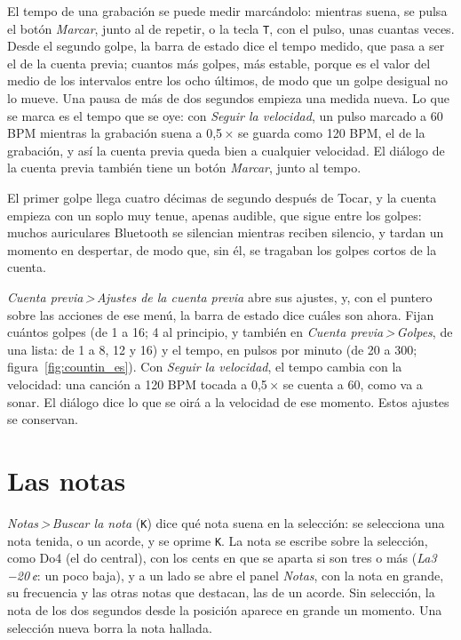 \documentclass[12pt,
              article,
              oneside
              ]{memoir}
\newcommand*{\menu}[1]{\textit{#1}}
\newcommand*{\then}{\,>\,}
\newcommand*{\key}[1]{\texttt{#1}}
\begin{document}
%
El tempo de una grabación se puede medir marcándolo: mientras suena, se
pulsa el botón \menu{Marcar}, junto al de repetir, o la tecla \key{T},
con el pulso, unas cuantas veces. Desde el segundo golpe, la barra de
estado dice el tempo medido, que pasa a ser el de la cuenta previa; cuantos
más golpes, más estable, porque es el valor del medio de los intervalos
entre los ocho últimos, de modo que un golpe desigual no lo mueve. Una
pausa de más de dos segundos empieza una medida nueva. Lo que se marca es
el tempo que se oye: con \menu{Seguir la velocidad}, un pulso marcado a
60 BPM mientras la grabación suena a 0,5\,× se guarda como 120 BPM, el de
la grabación, y así la cuenta previa queda bien a cualquier velocidad. El
diálogo de la cuenta previa también tiene un botón \menu{Marcar}, junto al
tempo.

%
El primer golpe llega cuatro décimas de segundo después de Tocar, y la
cuenta empieza con un soplo muy tenue, apenas audible, que sigue entre los
golpes: muchos auriculares Bluetooth se silencian mientras reciben
silencio, y tardan un momento en despertar, de modo que, sin él, se
tragaban los golpes cortos de la cuenta.

\menu{Cuenta previa\then Ajustes de la cuenta previa} abre sus ajustes, y,
con el puntero sobre las acciones de ese menú, la barra de estado dice
cuáles son ahora. Fijan cuántos golpes (de 1 a 16; 4 al principio, y
también en \menu{Cuenta previa\then Golpes}, de una lista: de 1 a 8, 12 y
16) y el tempo, en pulsos por
minuto (de 20 a 300; figura~\ref{fig:countin_es}). Con \menu{Seguir la
velocidad}, el tempo cambia con la velocidad: una canción a 120 BPM tocada
a 0,5\,× se cuenta a 60, como va a sonar. El diálogo dice lo que se oirá a
la velocidad de ese momento. Estos ajustes se conservan.

\section{Las notas}
\label{sec:notas}

%
\menu{Notas\then Buscar la nota} (\key{K}) dice qué nota suena en la
selección: se selecciona una nota tenida, o un acorde, y se oprime
\key{K}. La nota se escribe sobre la selección, como Do4 (el do central),
con los cents en que se aparta si son tres o más (\emph{La3 −20\,¢}: un
poco baja), y a un lado se abre el panel \menu{Notas}, con la nota en
grande, su frecuencia y las otras notas que destacan, las de un acorde. Sin
selección, la nota de los dos segundos desde la posición aparece en grande
un momento. Una selección nueva borra la nota hallada.
\end{document}
